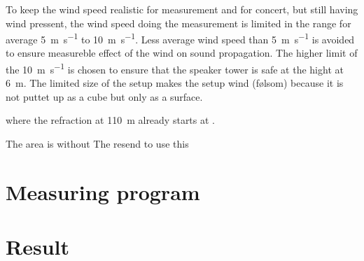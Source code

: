 To keep the wind speed realistic for measurement and for concert, but still having wind pressent, the wind speed doing the measurement is limited in the range for average \SI{5}{\meter\per\second} to \SI{10}{\meter\per\second}. Less average wind speed than \SI{5}{\meter\per\second} is avoided to ensure measureble effect of the wind on sound propagation. The higher limit of the \SI{10}{\meter\per\second} is chosen to ensure that the speaker tower is safe at the hight at \SI{6}{\meter}. The limited size of the setup makes the setup wind (følsom) because it is not puttet up as a cube but only as a surface. 




where the refraction at \SI{110}{\meter} already starts at . 


The area is without  The resend to use this  




\section{Measuring program}


\section{Result}







